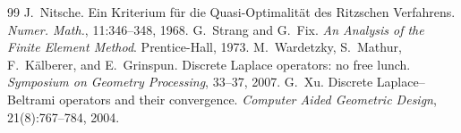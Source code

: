 \documentclass[11pt]{article}
\theoremstyle{plain}
\theoremstyle{definition}
\theoremstyle{remark}
\begin{document}
\begin{thebibliography}{99}
 J.~Nitsche. Ein Kriterium für die Quasi-Optimalität des Ritzschen Verfahrens. \emph{Numer. Math.}, 11:346--348, 1968.
 G.~Strang and G.~Fix. \emph{An Analysis of the Finite Element Method}. Prentice-Hall, 1973.
 M.~Wardetzky, S.~Mathur, F.~Kälberer, and E.~Grinspun. Discrete Laplace operators: no free lunch. \emph{Symposium on Geometry Processing}, 33--37, 2007.
 G.~Xu. Discrete Laplace--Beltrami operators and their convergence. \emph{Computer Aided Geometric Design}, 21(8):767--784, 2004.
\end{thebibliography}
\end{document}

